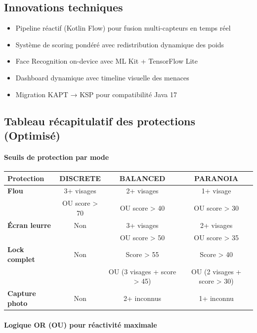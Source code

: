 \documentclass[11pt,a4paper]{article}
\begin{document}
\subsection{Innovations techniques}
\begin{itemize}
    \item Pipeline réactif (Kotlin Flow) pour fusion multi-capteurs en temps réel
    \item Système de scoring pondéré avec redistribution dynamique des poids
    \item Face Recognition on-device avec ML Kit + TensorFlow Lite
    \item Dashboard dynamique avec timeline visuelle des menaces
    \item Migration KAPT → KSP pour compatibilité Java 17
\end{itemize}

\subsection{Tableau récapitulatif des protections (Optimisé)}

\paragraph{Seuils de protection par mode}

\begin{center}
\begin{tabular}{lccc}
\toprule
\textbf{Protection} & \textbf{DISCRETE} & \textbf{BALANCED} & \textbf{PARANOIA}\\
\midrule
\textbf{Flou} & 3+ visages & 2+ visages & 1+ visage\\
 & OU score > 70 & OU score > 40 & OU score > 30\\
\midrule
\textbf{Écran leurre} & Non & 3+ visages & 2+ visages\\
 &  & OU score > 50 & OU score > 35\\
\midrule
\textbf{Lock complet} & Non & Score > 55 & Score > 40\\
 &  & OU (3 visages + score > 45) & OU (2 visages + score > 30)\\
\midrule
\textbf{Capture photo} & Non & 2+ inconnus & 1+ inconnu\\
\bottomrule
\end{tabular}
\end{center}

\paragraph{Logique OR (OU) pour réactivité maximale}
\end{document}

